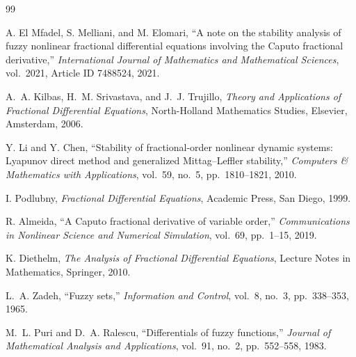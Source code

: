 \documentclass[11pt,a4paper]{article}
\theoremstyle{plain}
\theoremstyle{definition}
\theoremstyle{remark}
\begin{document}
	\begin{thebibliography}{99}
		
		A. El Mfadel, S. Melliani, and M. Elomari, ``A note on the stability analysis of fuzzy nonlinear fractional differential equations involving the Caputo fractional derivative,'' \emph{International Journal of Mathematics and Mathematical Sciences}, vol.~2021, Article ID 7488524, 2021.
		
		A.~A. Kilbas, H.~M. Srivastava, and J.~J. Trujillo, \emph{Theory and Applications of Fractional Differential Equations}, North-Holland Mathematics Studies, Elsevier, Amsterdam, 2006.
		
		Y. Li and Y. Chen, ``Stability of fractional-order nonlinear dynamic systems: Lyapunov direct method and generalized Mittag--Leffler stability,'' \emph{Computers \& Mathematics with Applications}, vol.~59, no.~5, pp.~1810--1821, 2010.
		
		I. Podlubny, \emph{Fractional Differential Equations}, Academic Press, San Diego, 1999.
		
		R. Almeida, ``A Caputo fractional derivative of variable order,'' \emph{Communications in Nonlinear Science and Numerical Simulation}, vol.~69, pp.~1--15, 2019.
		
		K. Diethelm, \emph{The Analysis of Fractional Differential Equations}, Lecture Notes in Mathematics, Springer, 2010.
		
		L.~A. Zadeh, ``Fuzzy sets,'' \emph{Information and Control}, vol.~8, no.~3, pp.~338--353, 1965.
		
		M.~L. Puri and D.~A. Ralescu, ``Differentials of fuzzy functions,'' \emph{Journal of Mathematical Analysis and Applications}, vol.~91, no.~2, pp.~552--558, 1983.
		
	\end{thebibliography}
	
	
\end{document}
